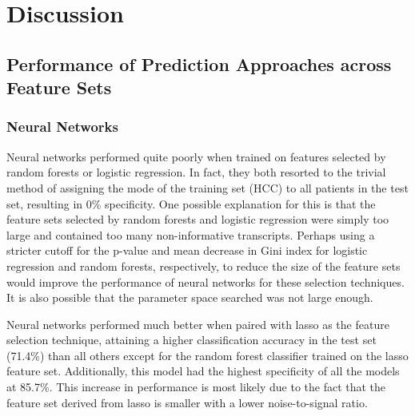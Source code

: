\documentclass[a4paper]{article}
\begin{document}

\section{Discussion}

\subsection{Performance of Prediction Approaches across Feature Sets}

\subsubsection{Neural Networks}
Neural networks performed quite poorly when trained on features selected by random forests or logistic regression. In fact, they both resorted to the trivial method of assigning the mode of the training set (HCC) to all patients in the test set, resulting in 0\% specificity. One possible explanation for this is that the feature sets selected by random forests and logistic regression were simply too large and contained too many non-informative transcripts. Perhaps using a stricter cutoff for the p-value and mean decrease in Gini index for logistic regression and random forests, respectively, to reduce the size of the feature sets would improve the performance of neural networks for these selection techniques. It is also possible that the parameter space searched was not large enough. 

Neural networks performed much better when paired with lasso as the feature selection technique, attaining a higher classification accuracy in the test set (71.4\%) than all others except for the random forest classifier trained on the lasso feature set. Additionally, this model had the highest specificity of all the models at 85.7\%. This increase in performance is most likely due to the fact that the feature set derived from lasso is smaller with a lower noise-to-signal ratio.
\end{document}
